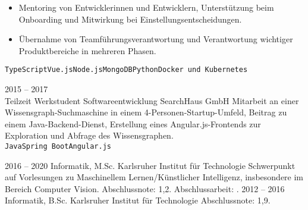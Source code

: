 \documentclass[8pt]{developercv} %
\newcommand{\linebreaksmall}{\vspace{2mm}}
\begin{document}
\begin{entrylist}
{\begin{itemize}[nosep, topsep=0pt, left=5pt, after=\vspace{6pt}]
			\item Mentoring von Entwicklerinnen und Entwicklern, Unterstützung beim Onboarding und Mitwirkung bei Einstellungsentscheidungen.
			\item Übernahme von Teamführungsverantwortung und Verantwortung wichtiger Produktbereiche in mehreren Phasen.
		\end{itemize}
		 \texttt{TypeScript}\slashsep\texttt{Vue.js}\slashsep\texttt{Node.js}\slashsep\texttt{MongoDB}\slashsep\texttt{Python}\slashsep\texttt{Docker und Kubernetes}} \linebreaksmall
	\entry
		{2015 -- 2017\\\footnotesize{Teilzeit}}
		{Werkstudent Softwareentwicklung}
		{SearchHaus GmbH}
		{Mitarbeit an einer Wissensgraph-Suchmaschine in einem 4-Personen-Startup-Umfeld, Beitrag zu einem Java-Backend-Dienst, Erstellung eines Angular.js-Frontends zur Exploration und Abfrage des Wissensgraphen.
		\linebreaksmall \\ \texttt{Java}\slashsep\texttt{Spring Boot}\slashsep\texttt{Angular.js}}
\end{entrylist}



\begin{entrylist}
	\entry
		{2016 -- 2020}
		{Informatik, M.Sc.}
		{Karlsruher Institut für Technologie}
		{Schwerpunkt auf Vorlesungen zu Maschinellem Lernen/Künstlicher Intelligenz, insbesondere im Bereich Computer Vision. Abschlussnote: 1,2. Abschlussarbeit: .}
	\entry
		{2012 -- 2016}
		{Informatik, B.Sc.}
		{Karlsruher Institut für Technologie}
		{Abschlussnote: 1,9.}
\end{entrylist}

\end{document}
